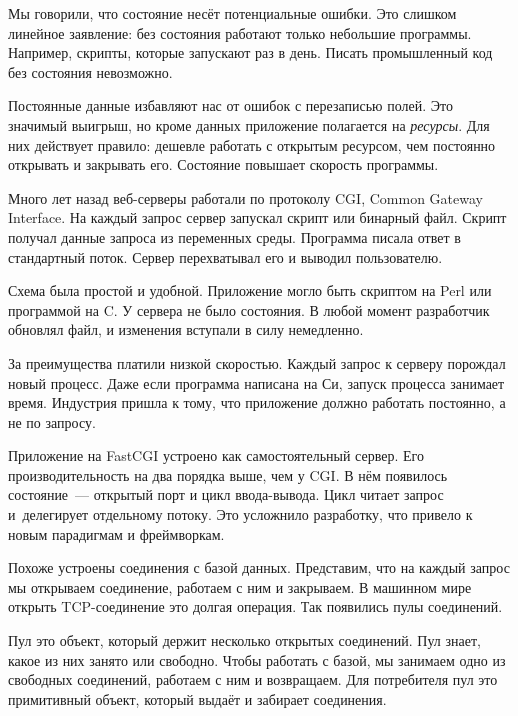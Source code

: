 Мы говорили, что состояние нес\"{е}т потенциальные ошибки. Это слишком линейное
заявление: без состояния работают только небольшие программы. Например, скрипты,
которые запускают раз в день. Писать промышленный код без состояния невозможно.


Постоянные данные избавляют нас от ошибок с перезаписью полей. Это значимый
выигрыш, но кроме данных приложение полагается на \emph{ресурсы}. Для них
действует правило: дешевле работать с открытым ресурсом, чем постоянно открывать
и закрывать его. Состояние повышает скорость программы.


Много лет назад веб-серверы работали по протоколу CGI, Common Gateway
Interface. На
каждый запрос сервер запускал скрипт или бинарный файл. Скрипт получал данные
запроса из переменных среды. Программа писала ответ в стандартный поток. Сервер
перехватывал его и выводил пользователю.

Схема была простой и удобной. Приложение могло быть скриптом на Perl или
программой на C\Plus\Plus. У сервера не было состояния. В любой момент
разработчик обновлял файл, и изменения вступали в силу немедленно.

За преимущества платили низкой скоростью. Каждый запрос к серверу порождал новый
процесс. Даже если программа написана на Си, запуск процесса занимает
время. Индустрия пришла к тому, что приложение должно работать постоянно, а не
по запросу.


Приложение на FastCGI устроено как самостоятельный сервер. Его
производительность на два порядка выше, чем у CGI. В н\"{е}м появилось
состояние~--- открытый порт и цикл ввода-вывода. Цикл читает запрос и~делегирует
отдельному потоку. Это усложнило разработку, что привело к новым парадигмам
и фреймворкам.

Похоже устроены соединения с базой данных. Представим, что на каждый запрос мы
открываем соединение, работаем с ним и закрываем. В машинном мире открыть
TCP-соединение это долгая операция. Так появились пулы соединений.


Пул это объект, который держит несколько открытых соединений. Пул знает, какое
из них занято или свободно. Чтобы работать с базой, мы занимаем одно из
свободных соединений, работаем с ним и возвращаем. Для потребителя пул это
примитивный объект, который выдаёт и забирает соединения.

